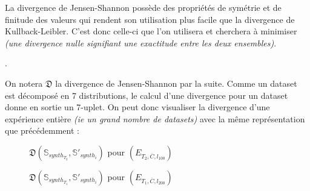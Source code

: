             \begin{tcolorbox}[colback=linkborder_Color!5!white,colframe=linkborder_Color!75!black]
                La divergence de Jensen-Shannon possède des propriétés de symétrie et de finitude
                des valeurs qui rendent son utilisation plus facile que la divergence de
                Kullback-Leibler. C'est donc celle-ci que l'on utilisera et cherchera à minimiser \textit{(une divergence nulle signifiant une exactitude entre les deux ensembles)}.
            \end{tcolorbox}.

            On notera $\mathfrak D$ la divergence de Jensen-Shannon par la suite. Comme un
            dataset est décomposé en 7 distributions, le calcul d'une divergence pour un dataset
            donne en sortie un 7-uplet. On peut donc visualiser la divergence d'une expérience
            entière \textit{(ie un grand nombre de datasets)} avec la même représentation que
            précédemment :

            \begin{figure}[H]
                \centering
                \caption{$\mathfrak{D}\left(\mathbb{S}_{synth_{T_2}},\mathbb{S}'_{synth_i}\right)$ pour $\left(E_{T_2, \overline C, l_{100}}\right)$}
            \end{figure}

            \begin{figure}[H]
                \centering
                \caption{$\mathfrak{D}\left(\mathbb{S}_{synth_{T_1}},\mathbb{S}'_{synth_i}\right)$ pour $\left(E_{T_1, \overline C, l_{200}}\right)$}
            \end{figure}
